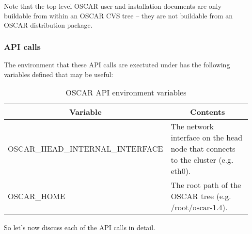 Note that the top-level OSCAR user and installation documents are only
buildable from within an OSCAR CVS tree -- they are not buildable from
an OSCAR distribution package.


\subsubsection{API calls}
\label{sec:design-pkg-api}

The environment that these API calls are exectuted under has the 
following variables defined that may be useful:

\begin{table}[htbp]
  \begin{center}
    \begin{tabular}{|l|p{3in}|}
      \hline
      \multicolumn{1}{|c|}{Variable} &
      \multicolumn{1}{|c|}{Contents} \\
      \hline
      \hline
      OSCAR\_HEAD\_INTERNAL\_INTERFACE & The network interface on the 
      head node that connects to the cluster (e.g. eth0).\\
%
      OSCAR\_HOME & The root path of the OSCAR tree 
      (e.g. /root/oscar-1.4). \\ 
%
    \end{tabular}
    \caption{OSCAR API environment variables}
    \label{tab:design-pkg-api-env}
  \end{center}
\end{table}

So let's now discuss each of the API calls in detail.

